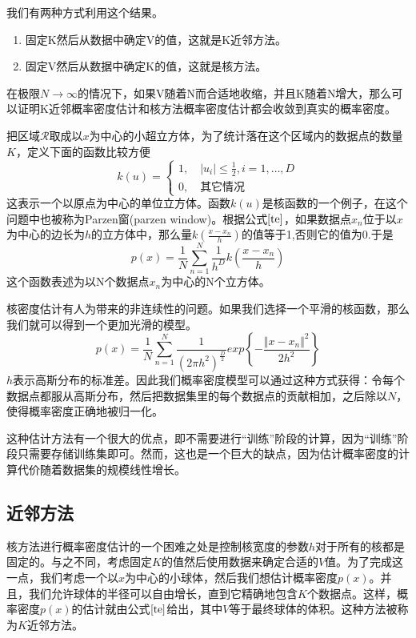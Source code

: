我们有两种方式利用这个结果。
\begin{enumerate}
	\item 固定K然后从数据中确定V的值，这就是K近邻方法。
	\item 固定V然后从数据中确定K的值，这就是核方法。
\end{enumerate}

在极限$N\to \infty$的情况下，如果V随着N而合适地收缩，并且K随着N增大，那么可以证明K近邻概率密度估计和核方法概率密度估计都会收敛到真实的概率密度。

把区域$\mathcal{R}$取成以$x$为中心的小超立方体，为了统计落在这个区域内的数据点的数量$K$，定义下面的函数比较方便
\begin{equation}
\label{te}
	k(u)=\begin{cases}
	1,\quad |u_i|\leqslant \frac{1}{2},i=1,\dots,D\\
	0,\quad \text{其它情况}
	\end{cases}
\end{equation}
这表示一个以原点为中心的单位立方体。函数$k(u)$是核函数的一个例子，在这个问题中也被称为Parzen窗(parzen window)。根据公式$\ref{te}$，如果数据点$x_n$位于以$x$为中心的边长为$h$的立方体中，那么量$k(\frac{x-x_n}{h})$的值等于1,否则它的值为0.于是
\begin{equation}
	p(x)=\frac{1}{N}\sum_{n=1}^{N}\frac{1}{h^D}k\left(\frac{x-x_n}{h} \right)
\end{equation}
这个函数表述为以N个数据点$x_n$为中心的N个立方体。

核密度估计有人为带来的非连续性的问题。如果我们选择一个平滑的核函数，那么我们就可以得到一个更加光滑的模型。
\begin{equation}
	p(x)=\frac{1}{N}\sum_{n=1}^{N}\frac{1}{(2\pi h^2)^{\frac{D}{2}}}exp\left\{-\frac{\Vert x-x_n\Vert^2}{2h^2} \right\}
\end{equation}
$h$表示高斯分布的标准差。因此我们概率密度模型可以通过这种方式获得：令每个数据点都服从高斯分布，然后把数据集里的每个数据点的贡献相加，之后除以$N$，使得概率密度正确地被归一化。

这种估计方法有一个很大的优点，即不需要进行“训练”阶段的计算，因为“训练”阶段只需要存储训练集即可。然而，这也是一个巨大的缺点，因为估计概率密度的计算代价随着数据集的规模线性增长。
\subsection*{近邻方法}
核方法进行概率密度估计的一个困难之处是控制核宽度的参数$h$对于所有的核都是固定的。与之不同，考虑固定$K$的值然后使用数据来确定合适的$V$值。为了完成这一点，我们考虑一个以$x$为中心的小球体，然后我们想估计概率密度$p(x)$。并且，我们允许球体的半径可以自由增长，直到它精确地包含$K$个数据点。这样，概率密度$p(x)$的估计就由公式$\ref{te}$给出，其中$V$等于最终球体的体积。这种方法被称为$K$近邻方法。

